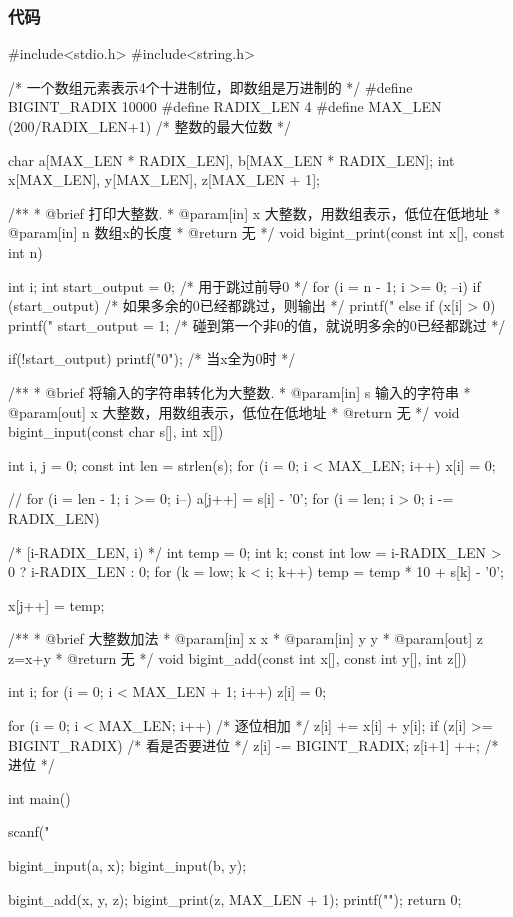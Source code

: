\subsubsection{代码}
\begin{Codex}[label=bigint_add.c]
#include<stdio.h>
#include<string.h>

/* 一个数组元素表示4个十进制位，即数组是万进制的 */
#define BIGINT_RADIX 10000
#define RADIX_LEN 4
#define MAX_LEN (200/RADIX_LEN+1)  /* 整数的最大位数 */

char    a[MAX_LEN * RADIX_LEN], b[MAX_LEN * RADIX_LEN];
int     x[MAX_LEN], y[MAX_LEN], z[MAX_LEN + 1];

/**
 * @brief 打印大整数.
 * @param[in] x 大整数，用数组表示，低位在低地址
 * @param[in] n 数组x的长度
 * @return 无
 */
void bigint_print(const int x[], const int n) {
    int i;
    int start_output = 0;  /* 用于跳过前导0 */
    for (i = n - 1; i >= 0; --i) {
        if (start_output) {  /* 如果多余的0已经都跳过，则输出 */
            printf("%
        } else if (x[i] > 0) {
            printf("%
            start_output = 1; /* 碰到第一个非0的值，就说明多余的0已经都跳过 */
        }
    }

    if(!start_output) printf("0");  /* 当x全为0时 */
}

/**
 * @brief 将输入的字符串转化为大整数.
 * @param[in] s 输入的字符串
 * @param[out] x 大整数，用数组表示，低位在低地址
 * @return 无
 */
void bigint_input(const char s[], int x[]) {
    int i, j = 0;
    const int len = strlen(s);
    for (i = 0; i < MAX_LEN; i++) x[i] = 0;

    // for (i = len - 1; i >= 0; i--) a[j++] = s[i] - '0';
    for (i = len; i > 0; i -= RADIX_LEN) {  /* [i-RADIX_LEN, i) */
        int temp = 0;
        int k;
        const int low = i-RADIX_LEN > 0 ? i-RADIX_LEN : 0;
        for (k = low; k < i; k++) {
            temp = temp * 10 + s[k] - '0';
        }

        x[j++] = temp;
    }
}

/**
 * @brief 大整数加法
 * @param[in] x x
 * @param[in] y y
 * @param[out] z z=x+y
 * @return 无
 */
void bigint_add(const int x[], const int y[], int z[]) {
    int i;
    for (i = 0; i < MAX_LEN + 1; i++) z[i] = 0;

    for (i = 0; i < MAX_LEN; i++) {  /* 逐位相加 */
        z[i] += x[i] + y[i];
        if (z[i] >= BIGINT_RADIX) {  /* 看是否要进位 */
            z[i] -= BIGINT_RADIX;
            z[i+1] ++;  /* 进位 */
        }
    }
}


int main() {
    scanf("%

    bigint_input(a, x);
    bigint_input(b, y);

    bigint_add(x, y, z);
    bigint_print(z, MAX_LEN + 1);
    printf("\n"); 
    return 0;
}
\end{Codex}

